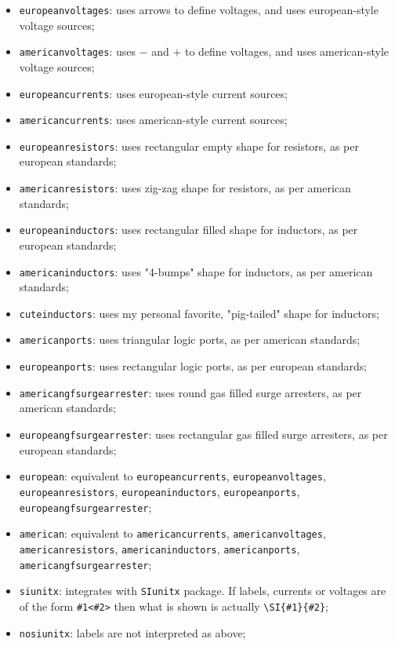 \documentclass[a4paper]{article}
\begin{document}
\begin{itemize}
	\item \texttt{europeanvoltages}: uses arrows to define voltages, and uses european-style voltage sources;
	\item \texttt{americanvoltages}: uses $-$ and $+$ to define voltages, and uses american-style voltage sources;
	\item \texttt{europeancurrents}: uses european-style current sources;
	\item \texttt{americancurrents}: uses american-style current sources;
	\item \texttt{europeanresistors}: uses rectangular empty shape for resistors, as per european standards;
	\item \texttt{americanresistors}: uses zig-zag shape for resistors, as per american standards;
	\item \texttt{europeaninductors}: uses rectangular filled shape for inductors, as per european standards;
	\item \texttt{americaninductors}: uses "4-bumps" shape for inductors, as per american standards;
	\item \texttt{cuteinductors}: uses my personal favorite, "pig-tailed" shape for inductors;
	\item \texttt{americanports}: uses triangular logic ports, as per american standards;
	\item \texttt{europeanports}: uses rectangular logic ports, as per european standards;
	\item \texttt{americangfsurgearrester}: uses round gas filled surge arresters, as per american standards;
	\item \texttt{europeangfsurgearrester}: uses rectangular gas filled surge arresters, as per european standards;
	\item \texttt{european}: equivalent to \texttt{europeancurrents}, \texttt{europeanvoltages}, \texttt{europeanresistors}, \texttt{europeaninductors}, \texttt{europeanports}, \texttt{europeangfsurgearrester};
	\item \texttt{american}: equivalent to \texttt{americancurrents}, \texttt{americanvoltages}, \texttt{americanresistors}, \texttt{americaninductors}, \texttt{americanports}, \texttt{americangfsurgearrester};
	\item \texttt{siunitx}: integrates with \texttt{SIunitx} package. If labels, currents or voltages are of the form \verb!#1<#2>! then what is shown is actually \verb!\SI{#1}{#2}!; 
	\item \texttt{nosiunitx}: labels are not interpreted as above;

\end{itemize}
\end{document}
